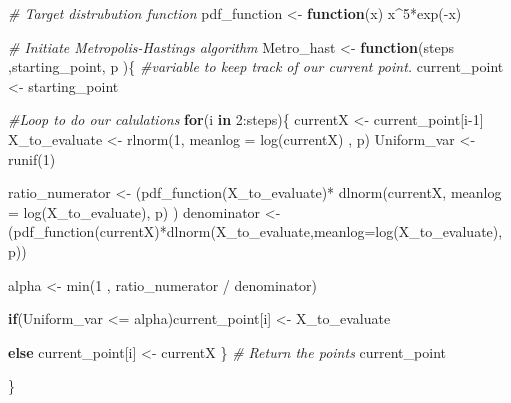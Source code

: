 \documentclass[
]{article}
\newenvironment{Shaded}{\begin{snugshade}}{\end{snugshade}}
\newcommand{\AttributeTok}[1]{\textcolor[rgb]{0.77,0.63,0.00}{#1}}
\newcommand{\CommentTok}[1]{\textcolor[rgb]{0.56,0.35,0.01}{\textit{#1}}}
\newcommand{\ControlFlowTok}[1]{\textcolor[rgb]{0.13,0.29,0.53}{\textbf{#1}}}
\newcommand{\DecValTok}[1]{\textcolor[rgb]{0.00,0.00,0.81}{#1}}
\newcommand{\FunctionTok}[1]{\textcolor[rgb]{0.00,0.00,0.00}{#1}}
\newcommand{\NormalTok}[1]{#1}
\newcommand{\OtherTok}[1]{\textcolor[rgb]{0.56,0.35,0.01}{#1}}
\newcommand{\SpecialCharTok}[1]{\textcolor[rgb]{0.00,0.00,0.00}{#1}}
\begin{document}
\begin{Shaded}
\begin{Highlighting}[]
\CommentTok{\# Target distrubution function}
\NormalTok{pdf\_function }\OtherTok{\textless{}{-}} \ControlFlowTok{function}\NormalTok{(x) x}\SpecialCharTok{\^{}}\DecValTok{5}\SpecialCharTok{*}\FunctionTok{exp}\NormalTok{(}\SpecialCharTok{{-}}\NormalTok{x)}

\CommentTok{\# Initiate Metropolis{-}Hastings algorithm}
\NormalTok{Metro\_hast }\OtherTok{\textless{}{-}} \ControlFlowTok{function}\NormalTok{(steps ,starting\_point, p )\{}
  \CommentTok{\#variable to keep track of our current point. }
\NormalTok{  current\_point }\OtherTok{\textless{}{-}}\NormalTok{ starting\_point}
  
  \CommentTok{\#Loop to do our calulations}
  \ControlFlowTok{for}\NormalTok{(i }\ControlFlowTok{in} \DecValTok{2}\SpecialCharTok{:}\NormalTok{steps)\{}
\NormalTok{    currentX }\OtherTok{\textless{}{-}}\NormalTok{ current\_point[i}\DecValTok{{-}1}\NormalTok{]}
\NormalTok{    X\_to\_evaluate }\OtherTok{\textless{}{-}} \FunctionTok{rlnorm}\NormalTok{(}\DecValTok{1}\NormalTok{, }\AttributeTok{meanlog =} \FunctionTok{log}\NormalTok{(currentX) , p)}
\NormalTok{    Uniform\_var }\OtherTok{\textless{}{-}} \FunctionTok{runif}\NormalTok{(}\DecValTok{1}\NormalTok{)}
    
\NormalTok{    ratio\_numerator }\OtherTok{\textless{}{-}}\NormalTok{ (}\FunctionTok{pdf\_function}\NormalTok{(X\_to\_evaluate)}\SpecialCharTok{*} \FunctionTok{dlnorm}\NormalTok{(currentX, }\AttributeTok{meanlog =} \FunctionTok{log}\NormalTok{(X\_to\_evaluate), p) )}
\NormalTok{    denominator }\OtherTok{\textless{}{-}}\NormalTok{ (}\FunctionTok{pdf\_function}\NormalTok{(currentX)}\SpecialCharTok{*}\FunctionTok{dlnorm}\NormalTok{(X\_to\_evaluate,}\AttributeTok{meanlog=}\FunctionTok{log}\NormalTok{(X\_to\_evaluate), p))}
    
\NormalTok{    alpha }\OtherTok{\textless{}{-}} \FunctionTok{min}\NormalTok{(}\DecValTok{1}\NormalTok{ , ratio\_numerator }\SpecialCharTok{/}\NormalTok{ denominator)}
    
    \ControlFlowTok{if}\NormalTok{(Uniform\_var }\SpecialCharTok{\textless{}=}\NormalTok{ alpha)current\_point[i] }\OtherTok{\textless{}{-}}\NormalTok{ X\_to\_evaluate}
    
    \ControlFlowTok{else}\NormalTok{ current\_point[i] }\OtherTok{\textless{}{-}}\NormalTok{ currentX}
\NormalTok{  \}}
 \CommentTok{\# Return the points}
\NormalTok{  current\_point}
  
\NormalTok{\}}
\end{Highlighting}
\end{Shaded}
\end{document}
